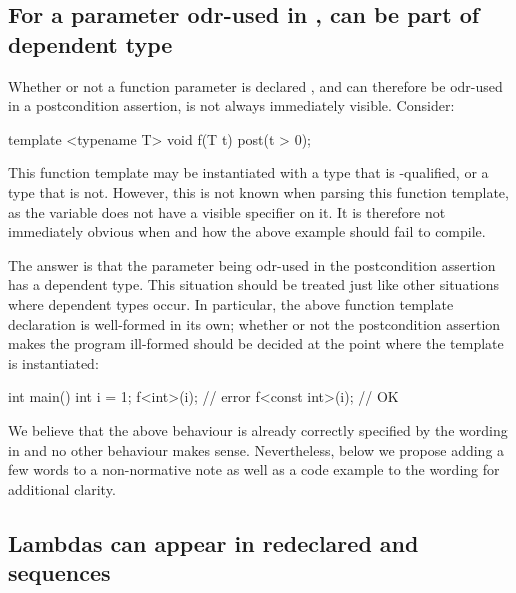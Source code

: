 \subsection{For a parameter odr-used in ,  can be part of dependent type}

Whether or not a function parameter is declared , and can therefore be odr-used in a postcondition assertion, is not always immediately visible. Consider:
\begin{codeblock}
template <typename T> 
void f(T t) post(t > 0); 
\end{codeblock}
This function template may be instantiated with a type that is -qualified, or a type that is not. However, this is not known when parsing this function template, as the variable  does not have a visible  specifier on it. It is therefore not immediately obvious when and how the above example should fail to compile.

The answer is that the parameter  being odr-used in the postcondition assertion has a dependent type. This situation should be treated just like other situations where dependent types occur. In particular, the above function template declaration is well-formed in its own; whether or not the postcondition assertion makes the program ill-formed should be decided at the point where the template is instantiated:
\begin{codeblock}
int main() {
  int i = 1;
  f<int>(i);       // error
  f<const int>(i); // OK
}
\end{codeblock}
We believe that the above behaviour is already correctly specified by the wording in \cite{P2900R10} and no other behaviour makes sense. Nevertheless, below we propose adding a few words to a non-normative note as well as a code example to the wording for additional clarity.

\subsection{Lambdas can appear in redeclared  and  sequences}


